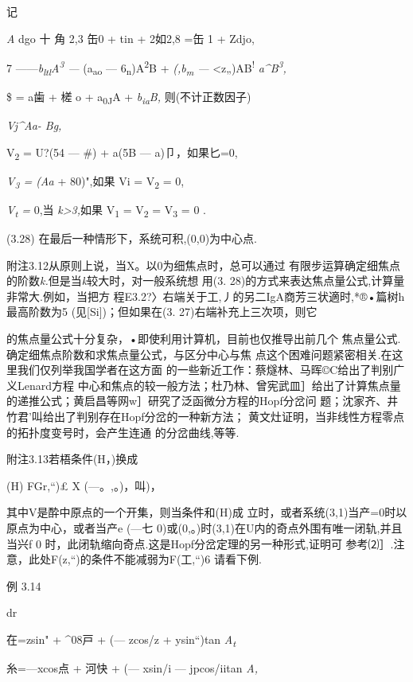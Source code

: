\documentclass{article}
\begin{document}
记

\emph{A} dgo 十 角 2,3 缶0 + tin + 2如2,8 =缶 1 + Zdjo,

7 ------\emph{b\textsubscript{ltl}A\textsuperscript{3} ---}
(a\textsubscript{ao} --- 6\textsubscript{n})A\textsuperscript{2}B +
\emph{(,b\textsubscript{m} ---} \textless{}z„)AB\textsuperscript{!}
\emph{a\^{}B\textsuperscript{3},}

\$ = a歯 + 槎 o + a\textsubscript{0J}A + \emph{b\textsubscript{ia}B,}
则(不计正数因子)

\emph{Vj\^{}Aa- Bg,}

V\textsubscript{2} = U?(54 --- \#) + a(5B --- a)卩，如果匕=0,

\emph{V\textsubscript{3} = (Aa} + 80)",如果 Vi = V\textsubscript{2} = 0,

\emph{V\textsubscript{t} =} 0,当 \emph{k\textgreater{}3,}如果
V\textsubscript{1} = V\textsubscript{2} = V\textsubscript{3} = 0 .

(3.28) 在最后一种情形下，系统可积,(0,0)为中心点.

附注3.12从原则上说，当X。以0为细焦点时，总可以通过
有限步运算确定细焦点的阶数\emph{k.}但是当\emph{k}较大时，对一般系统想
用(3. 28)的方式来表达焦点量公式,计算量非常大.例如，当把方
程E3.2?〉右端关于工,丿的另二IgA商芳三状適时,*®•篇树h 最高阶数为5
(见{[}Si{]})；但如果在(3. 27)右端补充上三次项，则它

的焦点量公式十分复杂，•即使利用计算机，目前也仅推导出前几个
焦点量公式.确定细焦点阶数和求焦点量公式，与区分中心与焦
点这个困难问题紧密相关.在这里我们仅列举我国学者在这方面
的一些新近工作：蔡燧林、马晖©C给出了判别广义Lenard方程
中心和焦点的较一般方法；杜乃林、曾宪武皿］给出了计算焦点量
的递推公式；黄启昌等网w］研究了泛函微分方程的Hopf分岔问
题；沈家齐、井竹君'叫给出了判别存在Hopf分岔的一种新方法；
黄文灶证明，当非线性方程零点的拓扑度变号时，会产生连通 的分岔曲线,等等.

附注3.13若梧条件(H，)换成

(H) FGr,``)£ X (---。,。)，叫)，

其中V是酔中原点的一个开集，则当条件和(H)成
立时，或者系统(3,1)当产=0时以原点为中心，或者当产e (---七
0)或(0,。)时(3,1)在U内的奇点外围有唯一闭轨,并且当兴f 0
时，此闭轨缩向奇点.这是Hopf分岔定理的另一种形式,证明可
参考⑵］.注意，此处F(z,``)的条件不能减弱为F(工,``)6 请看下例.

例 3.14

{dr}

在=zsin" + \^{}08戸 + (--- zcos/z + ysin``)tan \emph{A\textsubscript{t}}

糸=---xcos点 + 河快 + (--- xsin/i --- jpcos/iitan \emph{A,}
\end{document}
